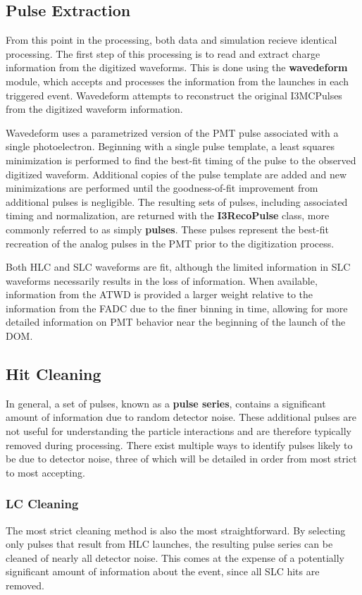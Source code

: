 \subsection{Pulse Extraction}
From this point in the processing, both data and simulation recieve identical processing.
The first step of this processing is to read and extract charge information from the digitized waveforms.
This is done using the \textbf{wavedeform} module, which accepts and processes the information from the launches in each triggered event.
Wavedeform attempts to reconstruct the original I3MCPulses from the digitized waveform information.

Wavedeform uses a parametrized version of the PMT pulse associated with a single photoelectron. 
Beginning with a single pulse template, a least squares minimization is performed to find the best-fit timing of the pulse to the observed digitized waveform.
Additional copies of the pulse template are added and new minimizations are performed until the goodness-of-fit improvement from additional pulses is negligible.
The resulting sets of pulses, including associated timing and normalization, are returned with the \textbf{I3RecoPulse} class, more commonly referred to as simply \textbf{pulses}.
These pulses represent the best-fit recreation of the analog pulses in the PMT prior to the digitization process.

Both HLC and SLC waveforms are fit, although the limited information in SLC waveforms necessarily results in the loss of information.
When available, information from the ATWD is provided a larger weight relative to the information from the FADC due to the finer binning in time, allowing for more detailed information on PMT behavior near the beginning of the launch of the DOM. 

\subsection{Hit Cleaning}
In general, a set of pulses, known as a \textbf{pulse series}, contains a significant amount of information due to random detector noise.
These additional pulses are not useful for understanding the particle interactions and are therefore typically removed during processing.
There exist multiple ways to identify pulses likely to be due to detector noise, three of which will be detailed in order from most strict to most accepting.

\subsubsection{LC Cleaning}
The most strict cleaning method is also the most straightforward. 
By selecting only pulses that result from HLC launches, the resulting pulse series can be cleaned of nearly all detector noise.
This comes at the expense of a potentially significant amount of information about the event, since all SLC hits are removed.

